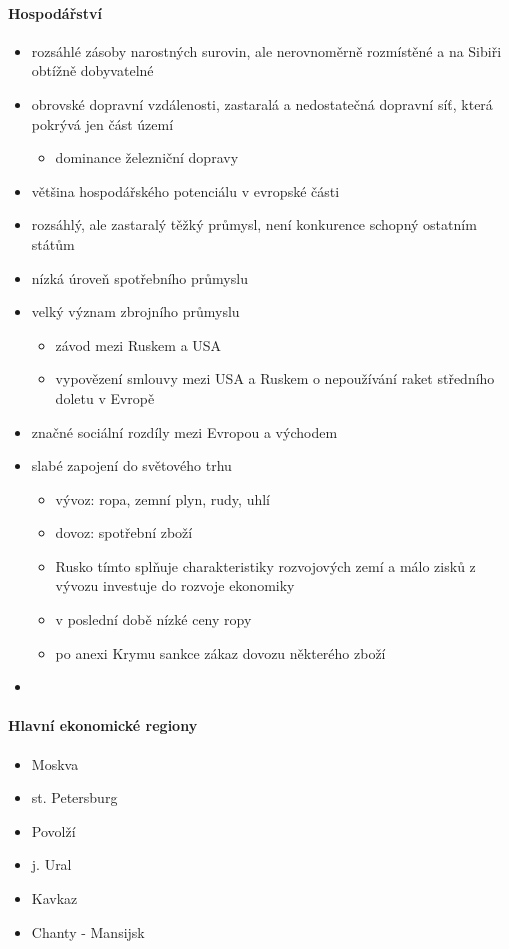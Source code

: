 \paragraph{Hospodářství}
\begin{itemize}
\item rozsáhlé zásoby narostných surovin, ale nerovnoměrně rozmístěné a na Sibiři obtížně dobyvatelné
\item obrovské dopravní vzdálenosti, zastaralá a nedostatečná dopravní síť, která pokrývá jen část území
	\begin{itemize}
	\item dominance železniční dopravy
	\end{itemize}
\item většina hospodářského potenciálu v evropské části
\item rozsáhlý, ale zastaralý těžký průmysl, není konkurence schopný ostatním státům
\item nízká úroveň spotřebního průmyslu
\item velký význam zbrojního průmyslu
	\begin{itemize}
	\item závod mezi Ruskem a USA
	\item vypovězení smlouvy mezi USA a Ruskem o nepoužívání raket středního doletu v Evropě
	\end{itemize}
\item značné sociální rozdíly mezi Evropou a východem
\item slabé zapojení do světového trhu
	\begin{itemize}
	\item vývoz: ropa, zemní plyn, rudy, uhlí
	\item dovoz: spotřební zboží
	\item Rusko tímto splňuje charakteristiky rozvojových zemí a málo zisků z vývozu investuje do rozvoje ekonomiky
	\item v poslední době nízké ceny ropy
	\item po anexi Krymu sankce \ra zákaz dovozu některého zboží
	\end{itemize}
\item 
\end{itemize}

\paragraph{Hlavní ekonomické regiony}
\begin{itemize}
\item Moskva
\item st. Petersburg
\item Povolží
\item j. Ural
\item Kavkaz
\item Chanty - Mansijsk
\end{itemize}




